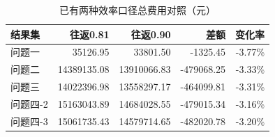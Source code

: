 \begin{table}[htbp]\centering\small
\caption{已有两种效率口径总费用对照（元）}\label{tab:efficiency}
\begin{tabular}{lrrrr}\toprule
结果集 & 往返0.81 & 往返0.90 & 差额 & 变化率\\\midrule
问题一 & 35126.95 & 33801.50 & -1325.45 & -3.77\%\\
问题二 & 14389135.08 & 13910066.83 & -479068.25 & -3.33\%\\
问题三 & 14022396.98 & 13558297.17 & -464099.81 & -3.31\%\\
问题四-2 & 15163043.89 & 14684028.55 & -479015.34 & -3.16\%\\
问题四-3 & 15061735.43 & 14579714.65 & -482020.78 & -3.20\%\\
\bottomrule\end{tabular}\end{table}
